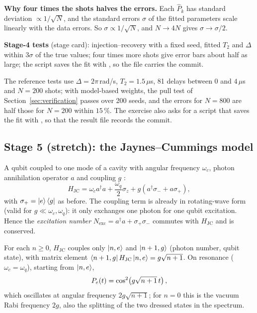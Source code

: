 \textbf{Why four times the shots halves the errors.} Each $\hat P_k$ has standard deviation
$\propto 1/\sqrt{N}$, and the standard errors $\sigma$ of the fitted parameters scale
linearly with the data errors. So $\sigma \propto 1/\sqrt{N}$, and $N \to 4N$ gives $\sigma \to \sigma/2$.

\textbf{Stage-4 tests} (stage card): injection--recovery with a fixed seed, fitted $T_2$
and $\Delta$ within $3\sigma$ of the true values; four times more shots give error bars
about half as large; the script saves the fit with , so the file
carries the commit.

The reference tests use $\Delta = 2\pi$\,rad/\textmu s, $T_2 = 1.5\,\mu$s, 81 delays
between $0$ and $4\,\mu$s and $N = 200$ shots; with model-based weights, the pull test of
Section~\ref{sec:verification} passes over 200 seeds, and the errors for $N = 800$ are half
those for $N = 200$ within $15\,\%$. The exercise also asks for a script
 that saves the fit with , so that the
result file records the commit.

\subsection{Stage 5 (stretch): the Jaynes--Cummings model}\label{sec:stage5}

A qubit coupled to one mode of a cavity with angular frequency $\omega_c$, photon
annihilation operator $a$ and coupling $g$ :
\begin{equation}\label{eq:jc}
  H_{\mathrm{JC}} = \omega_c a^\dagger a + \frac{\omega_q}{2}\sigma_z
    + g\left(a^\dagger\sigma_- + a\sigma_+\right),
\end{equation}
with $\sigma_+ = \ket{e}\bra{g}$ as before. The coupling term is already in
rotating-wave form (valid for $g \ll \omega_c, \omega_q$): it only exchanges one photon for
one qubit excitation. Hence the \emph{excitation number}
$N_{\mathrm{exc}} = a^\dagger a + \sigma_+\sigma_-$ commutes with $H_{\mathrm{JC}}$ and is
conserved.

For each $n \geq 0$, $H_{\mathrm{JC}}$ couples only $\ket{n, e}$ and $\ket{n+1, g}$ (photon
number, qubit state), with matrix element $\bra{n+1, g}H_{\mathrm{JC}}\ket{n, e} =
g\sqrt{n+1}$. On resonance ($\omega_c = \omega_q$), starting from $\ket{n, e}$,
\begin{equation}
  P_e(t) = \cos^2\!\left(g\sqrt{n+1}\,t\right),
\end{equation}
which oscillates at angular frequency $2g\sqrt{n+1}$; for $n = 0$ this is the vacuum Rabi
frequency $2g$, also the splitting of the two dressed states in the spectrum.

